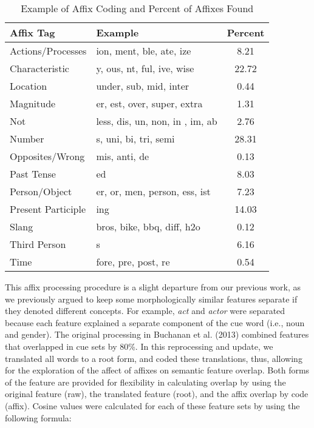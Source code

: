 \documentclass[english,man]{apa6}
\theoremstyle{definition}
\theoremstyle{definition}
\theoremstyle{definition}
\theoremstyle{remark}
\begin{document}
\begin{table}[tbp]
\begin{center}
\begin{threeparttable}
\caption{\label{tab:affix-table}Example of Affix Coding and Percent of Affixes Found}
\begin{tabular}{llc}
\toprule
Affix Tag & Example & Percent\\
\midrule
Actions/Processes & ion, ment, ble, ate, ize & 8.21\\
Characteristic & y, ous, nt, ful, ive, wise & 22.72\\
Location & under, sub, mid, inter & 0.44\\
Magnitude & er, est, over, super, extra & 1.31\\
Not & less, dis, un, non, in , im, ab & 2.76\\
Number & s, uni, bi, tri, semi & 28.31\\
Opposites/Wrong & mis, anti, de & 0.13\\
Past Tense & ed & 8.03\\
Person/Object & er, or, men, person, ess, ist & 7.23\\
Present Participle & ing & 14.03\\
Slang & bros, bike, bbq, diff, h2o & 0.12\\
Third Person & s & 6.16\\
Time & fore, pre, post, re & 0.54\\
\bottomrule
\end{tabular}
\end{threeparttable}
\end{center}
\end{table}

This affix processing procedure is a slight departure from our previous
work, as we previously argued to keep some morphologically similar
features separate if they denoted different concepts. For example,
\emph{act} and \emph{actor} were separated because each feature
explained a separate component of the cue word (i.e., noun and gender).
The original processing in Buchanan et al. (2013) combined features that
overlapped in cue sets by 80\%. In this reprocessing and update, we
translated all words to a root form, and coded these translations, thus,
allowing for the exploration of the affect of affixes on semantic
feature overlap. Both forms of the feature are provided for flexibility
in calculating overlap by using the original feature (raw), the
translated feature (root), and the affix overlap by code (affix). Cosine
values were calculated for each of these feature sets by using the
following formula:
\end{document}
